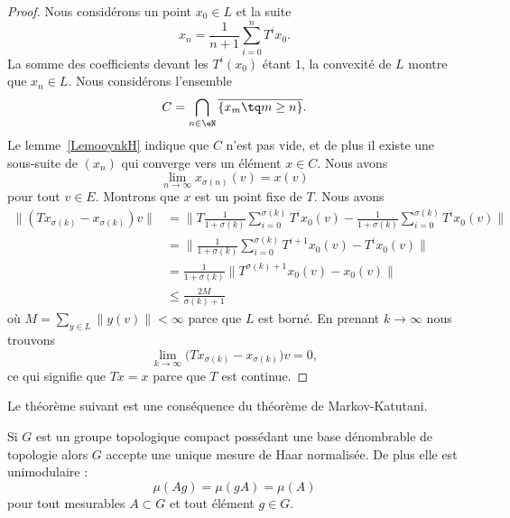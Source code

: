 \begin{proof}
    Nous considérons un point \( x_0\in L\) et la suite
    \begin{equation}
        x_n=\frac{1}{ n+1 }\sum_{i=0}^n T^ix_0.
    \end{equation}
    La somme des coefficients devant les \( T^i(x_0)\) étant \( 1\), la convexité de \( L\) montre que \( x_n\in L\). Nous considérons l'ensemble
    \begin{equation}
        C=\bigcap_{n\in \eN}\overline{ \{ x_m\tq m\geq n \} }.
    \end{equation}
    Le lemme~\ref{LemooynkH} indique que \( C\) n'est pas vide, et de plus il existe une sous-suite de \( (x_n)\) qui converge vers un élément \( x\in C\). Nous avons
    \begin{equation}
        \lim_{n\to \infty} x_{\sigma(n)}(v)=x(v)
    \end{equation}
    pour tout \( v\in E\). Montrons que \( x\) est un point fixe de \( T\). Nous avons
    \begin{subequations}
        \begin{align}
            \| (Tx_{\sigma(k)}-x_{\sigma(k)})v \|&=\Big\| T\frac{1}{ 1+\sigma(k) }\sum_{i=0}^{\sigma(k)}T^ix_0(v)-\frac{1}{ 1+\sigma(k) }\sum_{i=0}^{\sigma(k)}T^ix_0(v) \Big\|\\
            &=\Big\| \frac{1}{ 1+\sigma(k) }\sum_{i=0}^{\sigma(k)}T^{i+1}x_0(v)-T^ix_0(v) \Big\|\\
            &=\frac{1}{ 1+\sigma(k) }\big\| T^{\sigma(k)+1}x_0(v)-x_0(v) \big\|\\
            &\leq\frac{ 2M }{ \sigma(k)+1 }
        \end{align}
    \end{subequations}
    où \( M=\sum_{y\in L}\| y(v) \|<\infty\) parce que \( L\) est borné. En prenant \( k\to\infty\) nous trouvons
    \begin{equation}
        \lim_{k\to \infty} \big( Tx_{\sigma(k)}-x_{\sigma(k)} \big)v=0,
    \end{equation}
    ce qui signifie que \( Tx=x\) parce que \( T\) est continue.
\end{proof}

Le théorème suivant est une conséquence du théorème de Markov-Katutani.
\begin{theorem} \label{ThoBZBooOTxqcI}
    Si \( G\) est un groupe topologique compact possédant une base dénombrable de topologie alors \( G\) accepte une unique mesure de Haar normalisée. De plus elle est unimodulaire :
    \begin{equation}
        \mu(Ag)=\mu(gA)=\mu(A)
    \end{equation}
    pour tout mesurables \( A\subset G\) et tout élément \( g\in G\).
\end{theorem}

